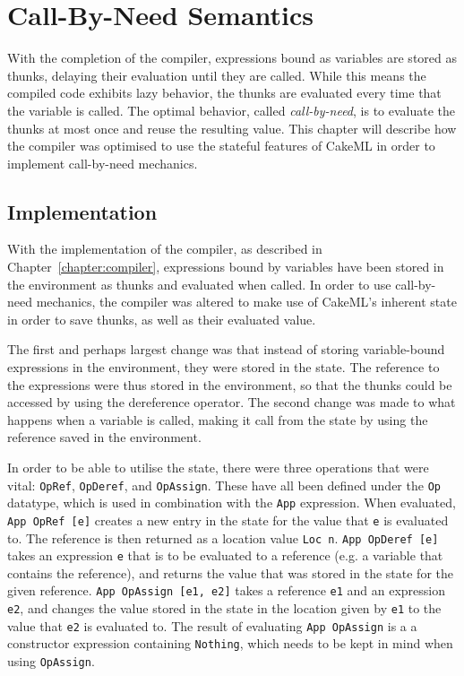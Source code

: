 \chapter{Call-By-Need Semantics}
With the completion of the compiler, expressions bound as variables are stored
as thunks, delaying their evaluation until they are called. While this means
the compiled code exhibits lazy behavior, the thunks are evaluated every
time that the variable is called. The optimal behavior, called
\textit{call-by-need}, is to evaluate the thunks at most once and reuse the
resulting value. This chapter will describe how the compiler was optimised to
use the stateful features of CakeML in order to implement call-by-need
mechanics.

\section{Implementation}
With the implementation of the compiler, as described in
Chapter~\ref{chapter:compiler}, expressions bound by variables have been stored
in the environment as thunks and evaluated when called. In order to use
call-by-need mechanics, the compiler was altered to make use of CakeML's
inherent state in order to save thunks, as well as their evaluated value.

The first and perhaps largest change was that instead of storing variable-bound
expressions in the environment, they were stored in the state. The reference to
the expressions were thus stored in the environment, so that the thunks could be
accessed by using the dereference operator. The second change was made to what
happens when a variable is called, making it call from the state by using the
reference saved in the environment.

In order to be able to utilise the state, there were three operations that were
vital: \texttt{OpRef}, \texttt{OpDeref}, and \texttt{OpAssign}. These have all
been defined under the \texttt{Op} datatype, which is used in combination with
the \texttt{App} expression. When evaluated, \texttt{App OpRef [e]} creates a new
entry in the state for the value that \texttt{e} is evaluated to. The reference
is then returned as a location value \texttt{Loc n}. \texttt{App OpDeref [e]}
takes an expression \texttt{e} that is to be evaluated to a reference (e.g. a
variable that contains the reference), and returns the value that was stored in
the state for the given reference. \texttt{App OpAssign [e1, e2]} takes a
reference \texttt{e1} and an expression \texttt{e2}, and changes the value
stored in the state in the location given by \texttt{e1} to the value that
\texttt{e2} is evaluated to. The result of evaluating \texttt{App OpAssign}
is a a constructor expression containing \texttt{Nothing}, which needs to be
kept in mind when using \texttt{OpAssign}.


